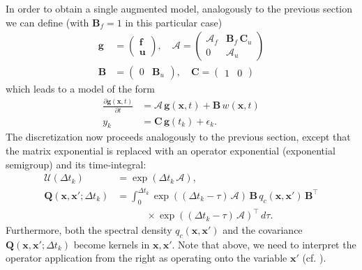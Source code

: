 \documentclass[journal]{IEEEtran}
\begin{document}
In order to obtain a single augmented model, analogously to the previous section we can define (with $\mathbf{B}_f = 1$ in this particular case)
%
\begin{equation}
\begin{split}
  \mathbf{g} &= \begin{pmatrix}
	\mathbf{f} \\ \mathbf{u}
  \end{pmatrix}, \quad
  \mathbf{\mathcal{A}}
  = \begin{pmatrix}
	\mathbf{\mathcal{A}}_f & \mathbf{B}_f \, \mathbf{C}_u \\
	0 & \mathbf{\mathcal{A}}_u
  \end{pmatrix} \\
  \mathbf{B}
  &= \begin{pmatrix}
	0 & \mathbf{B}_u
  \end{pmatrix}, \quad
  \mathbf{C}
  = \begin{pmatrix}
	1 & 0
  \end{pmatrix}
\end{split}
\end{equation}
%
which leads to a model of the form
%
\begin{equation}
\begin{split}
  \frac{\partial \mathbf{g}(\mathbf{x},t)}{\partial t}
  &= \mathbf{\mathcal{A}} \, \mathbf{g}(\mathbf{x},t)
  + \mathbf{B} \, w(\mathbf{x},t) \\
  y_k &= \mathbf{C} \, \mathbf{g}(t_k) + \epsilon_k.
\end{split}
\label{eq:ssaug2}
\end{equation}
%
The discretization now proceeds analogously to the previous section, except that the matrix exponential is replaced with an operator exponential (exponential semigroup) and its time-integral:
%
\begin{equation}
\begin{split}
  \mathbf{\mathcal{U}}(\Delta t_k)  &= \exp(\Delta t_k \, \mathbf{\mathcal{A}}), \\
  \mathbf{Q}(\mathbf{x},\mathbf{x}';\Delta t_k) &= \int_0^{\Delta t_k} \exp((\Delta t_k - \tau) \, 
  \mathbf{\mathcal{A}}) \,
  \mathbf{B} \, q_c(\mathbf{x},\mathbf{x}')  \, \mathbf{B}^{\top} \\
  &\qquad \quad \times \exp((\Delta t_k - \tau) \, \mathbf{\mathcal{A}})^{\top} \, d\tau.
\end{split}
\end{equation}
%
Furthermore, both the spectral density $q_c(\mathbf{x},\mathbf{x}')$ and the covariance $\mathbf{Q}(\mathbf{x},\mathbf{x}';\Delta t_k)$ become kernels in $\mathbf{x},\mathbf{x}'$. Note that above, we need to interpret the operator application from the right as operating onto the variable $\mathbf{x}'$ (cf. \cite{Sarkka+Hartikainen:2012}).
\end{document}

